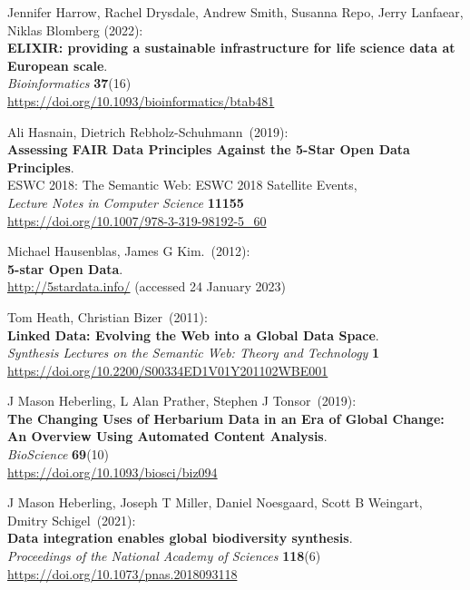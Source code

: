 \begin{thebibliography}{9}
Jennifer Harrow, Rachel Drysdale, Andrew Smith, Susanna Repo, Jerry Lanfaear, Niklas Blomberg (2022): \\
\textbf{ELIXIR: providing a sustainable infrastructure for life science data at European scale}.\\
\emph{Bioinformatics} \textbf{37}(16)\\
\url{https://doi.org/10.1093/bioinformatics/btab481}

Ali Hasnain, Dietrich Rebholz-Schuhmann~(2019): \\
\textbf{Assessing FAIR Data Principles Against the 5-Star Open Data Principles}.\\
ESWC 2018: The Semantic Web: ESWC 2018 Satellite Events,\\
\emph{Lecture Notes in Computer Science} \textbf{11155}\\
\url{https://doi.org/10.1007/978-3-319-98192-5_60}

Michael Hausenblas, James G Kim.~(2012): \\
\textbf{5-star {Open Data}}. \\
\url{http://5stardata.info/} (accessed 24 January 2023)

Tom Heath, Christian Bizer~(2011): \\
\textbf{Linked Data: Evolving the Web into a Global Data Space}.\\
\emph{Synthesis Lectures on the Semantic Web: Theory and Technology} \textbf{1}\\
\url{https://doi.org/10.2200/S00334ED1V01Y201102WBE001}

J Mason Heberling, L Alan Prather, Stephen J Tonsor~(2019): \\
\textbf{The Changing Uses of Herbarium Data in an Era of Global Change: An Overview Using Automated Content Analysis}.\\
\emph{BioScience} \textbf{69}(10)\\
\url{https://doi.org/10.1093/biosci/biz094}

J Mason Heberling, Joseph T Miller, Daniel Noesgaard, Scott B Weingart, Dmitry Schigel~(2021): \\
\textbf{Data integration enables global biodiversity synthesis}.\\
\emph{Proceedings of the National Academy of Sciences} \textbf{118}(6)\\
\url{https://doi.org/10.1073/pnas.2018093118}


\end{thebibliography}
